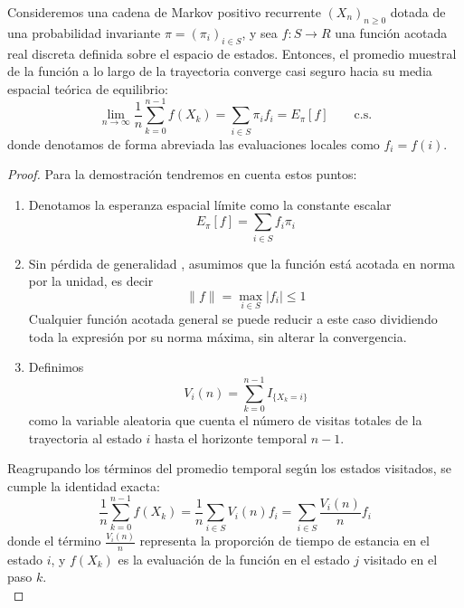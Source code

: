 \begin{coro}
    Consideremos una cadena de Markov positivo recurrente $(X_n)_{n \geq 0}$ dotada de una probabilidad invariante \mbox{$\pi = (\pi_i)_{i \in S}$}, y sea $f: S \to R$ una función acotada real discreta definida sobre el espacio de estados. Entonces, el promedio muestral de la función a lo largo de la trayectoria converge casi seguro hacia su media espacial teórica de equilibrio:
    \[
    \lim_{n \to \infty} \frac{1}{n} \sum_{k=0}^{n-1} f(X_k) = \sum_{i \in S}\pi_i f_i=E_{\pi}[f] \qquad \text{c.s.}
    \]
    donde denotamos de forma abreviada las evaluaciones locales como $f_i = f(i)$.
\begin{proof}
Para la demostración tendremos en cuenta estos puntos:
\begin{enumerate}
    \item Denotamos la esperanza espacial límite como la constante escalar 
    $$E_{\pi}[f] = \sum_{i \in S} f_i \pi_i$$
    \item Sin pérdida de generalidad , asumimos que la función está acotada en norma por la unidad, es decir
    $$\|f\| = \max_{i \in S} |f_i| \le 1$$ 
    Cualquier función acotada general se puede reducir a este caso dividiendo toda la expresión por su norma máxima, sin alterar la convergencia.
    \item Definimos 
    $$V_i(n) = \sum_{k=0}^{n-1} I_{\{X_k = i\}}$$
    como la variable aleatoria que cuenta el número de visitas totales de la trayectoria al estado $i$ hasta el horizonte temporal $n-1$.
\end{enumerate}
Reagrupando los términos del promedio temporal según los estados visitados, se cumple la identidad exacta:
\[
\frac{1}{n} \sum_{k=0}^{n-1} f(X_k) = \frac{1}{n} \sum_{i \in S} V_i(n) f_i = \sum_{i \in S} \frac{V_i(n)}{n} f_i
\]
donde el término $\frac{V_i(n)}{n}$ representa la proporción de tiempo de estancia en el estado $i$, y $f(X_k)$ es la evaluación de la función en el estado $j$ visitado en el paso $k$. \\


\end{proof}
\end{coro}
